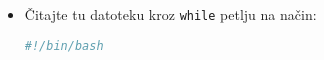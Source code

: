 \documentclass{exam}
\newcommand{\shell}[1]{\texttt{#1}}
\begin{document}
\begin{itemize}
                                                                                                                                                    u
                                                                                                                                                    \shell{/tmp/lab1.dat}.
                                                                                                                                                        \item[d)]Čitajte
                                                                                                                                                        tu
                                                                                                                                                        datoteku
                                                                                                                                                        kroz
                                                                                                                                                        \shell{while}
                                                                                                                                                        petlju
                                                                                                                                                        na
                                                                                                                                                        način:
                                                                                                                                                            \begin{lstlisting}[language=bash,caption={Iteracija
                                                                                                                                                            kroz
                                                                                                                                                            redove
                                                                                                                                                            datoteke}]
                                                                                                                                                                #!/bin/bash
                                                                                                                                                                    ... 

\end{lstlisting}
\end{itemize}
\end{document}
